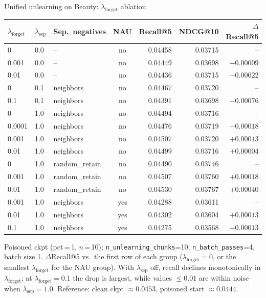 \begin{frame}{Unified unlearning on Beauty: $\lambda_{\text{forget}}$ ablation}
  \begin{table}
    \centering
    \footnotesize
    \begin{tabular}{l l l c r r r}
      \hline
      $\lambda_{\text{forget}}$ & $\lambda_{\text{sep}}$ & Sep.\ negatives & NAU & Recall@5 & NDCG@10 & $\Delta$Recall@5 \\
      \hline
      0      & 0.0 & --             & no  & 0.04458 & 0.03715 & --         \\
      0.001  & 0.0 & --             & no  & 0.04449 & 0.03698 & $-0.00009$ \\
      0.01   & 0.0 & --             & no  & 0.04436 & 0.03715 & $-0.00022$ \\[2pt]
      0      & 0.1 & neighbors      & no  & 0.04467 & 0.03720 & --         \\
      0.1    & 0.1 & neighbors      & no  & 0.04391 & 0.03698 & $-0.00076$ \\[2pt]
      0      & 1.0 & neighbors      & no  & 0.04494 & 0.03716 & --         \\
      0.0001 & 1.0 & neighbors      & no  & 0.04476 & 0.03719 & $-0.00018$ \\
      0.001  & 1.0 & neighbors      & no  & 0.04507 & 0.03720 & $+0.00013$ \\
      0.01   & 1.0 & neighbors      & no  & 0.04499 & 0.03716 & $+0.00004$ \\[2pt]
      0      & 1.0 & random\_retain & no  & 0.04490 & 0.03746 & --         \\
      0.001  & 1.0 & random\_retain & no  & 0.04507 & 0.03760 & $+0.00018$ \\
      0.01   & 1.0 & random\_retain & no  & 0.04530 & 0.03767 & $+0.00040$ \\[2pt]
      0.001  & 1.0 & neighbors      & yes & 0.04288 & 0.03611 & --         \\
      0.01   & 1.0 & neighbors      & yes & 0.04302 & 0.03604 & $+0.00013$ \\
      0.1    & 1.0 & neighbors      & yes & 0.04275 & 0.03568 & $-0.00013$ \\
      \hline
    \end{tabular}
  \end{table}

  \medskip
  {\scriptsize
    Poisoned ckpt (pct\,=\,1, $n$\,=\,10); \texttt{n\_unlearning\_chunks}=10,
    \texttt{n\_batch\_passes}=4, batch size 1.
    $\Delta$Recall@5 vs.\ the first row of each group ($\lambda_{\text{forget}}=0$,
    or the smallest $\lambda_{\text{forget}}$ for the NAU group).
    With $\lambda_{\text{sep}}$ off, recall declines monotonically in
    $\lambda_{\text{forget}}$; at $\lambda_{\text{forget}}=0.1$ the drop is largest,
    while values $\leq 0.01$ are within noise when $\lambda_{\text{sep}}=1.0$.
    Reference: clean ckpt $\approx 0.0453$, poisoned start $\approx 0.0444$.}
\end{frame}

